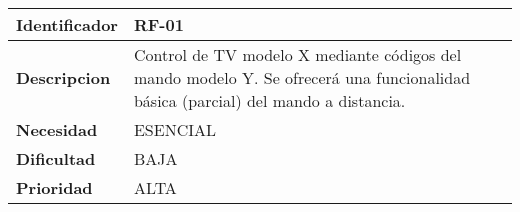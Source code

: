 \begin{center}
    \begin{tabular}{|p{2.6cm}|p{12cm}|}
    \hline
    \textbf{Identificador} & RF-01\\
    \hline
    \textbf{Descripcion} & Control de TV modelo X mediante códigos del mando modelo Y. Se ofrecerá una funcionalidad básica (parcial) del mando a distancia.\\
    \hline
    \textbf{Necesidad} & ESENCIAL\\
    \hline
    \textbf{Dificultad} & BAJA\\
    \hline
    \textbf{Prioridad} & ALTA\\
    \hline
    \end{tabular}
\end{center}
